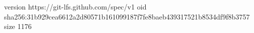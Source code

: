 version https://git-lfs.github.com/spec/v1
oid sha256:31b929cea6612a2d80571b161099187f7fe8baeb439317521b8534df9f8b3757
size 1176
